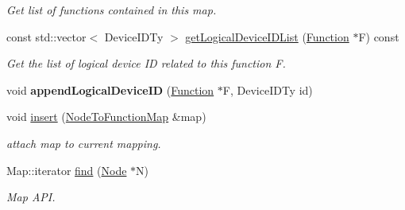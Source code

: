 \begin{DoxyCompactItemize}
\begin{DoxyCompactList}\small\item\em Get list of functions contained in this map. \end{DoxyCompactList}\item 
\mbox{\label{classglow_1_1_node_to_function_map_ad347c6eb31d1ade690fac50e2766b92e}} 
const std\+::vector$<$ Device\+I\+D\+Ty $>$ \hyperlink{classglow_1_1_node_to_function_map_ad347c6eb31d1ade690fac50e2766b92e}{get\+Logical\+Device\+I\+D\+List} (\hyperlink{classglow_1_1_function}{Function} $\ast$F) const
\begin{DoxyCompactList}\small\item\em Get the list of logical device ID related to this function {\ttfamily F}. \end{DoxyCompactList}\item 
\mbox{\label{classglow_1_1_node_to_function_map_a70cbeed58d0a72d51b86153bff4d4ed6}} 
void {\bfseries append\+Logical\+Device\+ID} (\hyperlink{classglow_1_1_function}{Function} $\ast$F, Device\+I\+D\+Ty id)
\item 
\mbox{\label{classglow_1_1_node_to_function_map_a8ce2ba5586395750dd7119243c8d0666}} 
void \hyperlink{classglow_1_1_node_to_function_map_a8ce2ba5586395750dd7119243c8d0666}{insert} (\hyperlink{classglow_1_1_node_to_function_map}{Node\+To\+Function\+Map} \&map)
\begin{DoxyCompactList}\small\item\em attach {\ttfamily map} to current mapping. \end{DoxyCompactList}\item 
\mbox{\label{classglow_1_1_node_to_function_map_a0bb014d5c017599738eaead6411a7e9a}} 
Map\+::iterator \hyperlink{classglow_1_1_node_to_function_map_a0bb014d5c017599738eaead6411a7e9a}{find} (\hyperlink{classglow_1_1_node}{Node} $\ast$N)
\begin{DoxyCompactList}\small\item\em Map A\+PI. \end{DoxyCompactList}\item 
\mbox{\label{classglow_1_1_node_to_function_map_ab7adf79a10de09aa10747f39dddc8e8f}} 

\end{DoxyCompactItemize}
